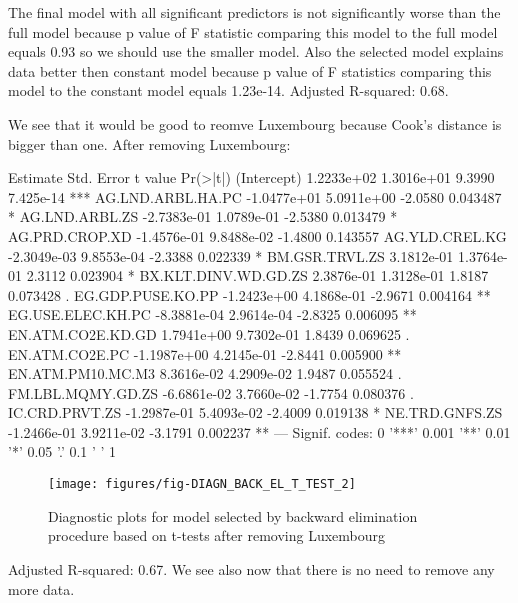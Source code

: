 \documentclass[a4paper]{article}
\begin{document}
The final model with all significant predictors is not significantly worse than
the full model because p value of F statistic comparing this model to the full
model equals
0.93 so we should use the smaller model. Also the selected model explains data better then constant model because p value of F statistics comparing this model to the
constant model equals 1.23e-14.
Adjusted R-squared: 0.68.

We see that it would be good to reomve Luxembourg because Cook's distance is bigger
than one. After removing Luxembourg:

\begin{Schunk}
\begin{Soutput}
                        Estimate  Std. Error t value  Pr(>|t|)    
(Intercept)           1.2233e+02  1.3016e+01  9.3990 7.425e-14 ***
AG.LND.ARBL.HA.PC    -1.0477e+01  5.0911e+00 -2.0580  0.043487 *  
AG.LND.ARBL.ZS       -2.7383e-01  1.0789e-01 -2.5380  0.013479 *  
AG.PRD.CROP.XD       -1.4576e-01  9.8488e-02 -1.4800  0.143557    
AG.YLD.CREL.KG       -2.3049e-03  9.8553e-04 -2.3388  0.022339 *  
BM.GSR.TRVL.ZS        3.1812e-01  1.3764e-01  2.3112  0.023904 *  
BX.KLT.DINV.WD.GD.ZS  2.3876e-01  1.3128e-01  1.8187  0.073428 .  
EG.GDP.PUSE.KO.PP    -1.2423e+00  4.1868e-01 -2.9671  0.004164 ** 
EG.USE.ELEC.KH.PC    -8.3881e-04  2.9614e-04 -2.8325  0.006095 ** 
EN.ATM.CO2E.KD.GD     1.7941e+00  9.7302e-01  1.8439  0.069625 .  
EN.ATM.CO2E.PC       -1.1987e+00  4.2145e-01 -2.8441  0.005900 ** 
EN.ATM.PM10.MC.M3     8.3616e-02  4.2909e-02  1.9487  0.055524 .  
FM.LBL.MQMY.GD.ZS    -6.6861e-02  3.7660e-02 -1.7754  0.080376 .  
IC.CRD.PRVT.ZS       -1.2987e-01  5.4093e-02 -2.4009  0.019138 *  
NE.TRD.GNFS.ZS       -1.2466e-01  3.9211e-02 -3.1791  0.002237 ** 
---
Signif. codes:  0 '***' 0.001 '**' 0.01 '*' 0.05 '.' 0.1 ' ' 1
\end{Soutput}
\end{Schunk}

\begin{figure}[H]
\begin{center}
\texttt{[image: figures/fig-DIAGN\_BACK\_EL\_T\_TEST\_2]}
\caption{Diagnostic plots for model selected by backward elimination procedure
based on t-tests after removing Luxembourg}
\end{center}
\end{figure}
Adjusted R-squared:
0.67. We see also now
that there is no need to remove any more data.
\end{document}
